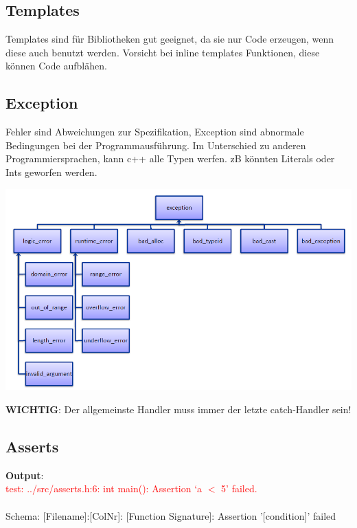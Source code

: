 \newpage
\subsection{Templates}
Templates sind für Bibliotheken gut geeignet, da sie nur Code erzeugen, wenn diese auch benutzt werden. Vorsicht bei inline templates Funktionen, diese können Code aufblähen.

\newpage
\subsection{Exception}
Fehler sind Abweichungen zur Spezifikation, Exception sind abnormale Bedingungen bei der Programmausführung. Im Unterschied zu anderen Programmiersprachen, kann c++ alle Typen werfen. zB könnten Literals oder Ints geworfen werden.

\includegraphics[width=\columnwidth]{Images/exceptions}


\noindent \textbf{WICHTIG}: Der allgemeinste Handler muss immer der letzte catch-Handler sein!


\subsection{Asserts}


\noindent \textbf{Output}:\\
\textcolor{red}{test: ../src/asserts.h:6: int main(): Assertion `a $<$ 5' failed.}\\
~\\
Schema: [Filename]:[ColNr]: [Function Signature]: Assertion '[condition]' failed





